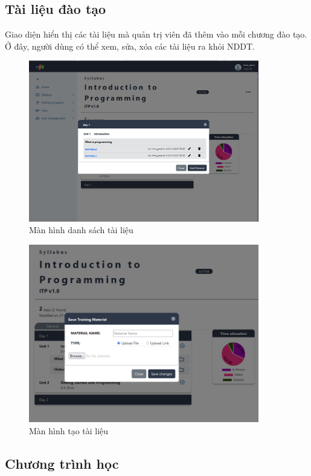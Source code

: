 \documentclass[report.tex]{subfiles}
\begin{document}
\subsection{Tài liệu đào tạo}

Giao diện hiển thị các tài liệu mà quản trị viên đã thêm vào mỗi chương đào tạo.
Ở đây, người dùng có thể xem, sửa, xóa các tài liệu ra khỏi NDDT.

\begin{figure}[!htb]
{\centering
\includegraphics[width=380px]{../meta/ui.material-list.png}
\caption{Màn hình danh sách tài liệu}
\par
}
\end{figure}
\FloatBarrier

\begin{figure}[!htb]
{\centering
\includegraphics[width=380px]{../meta/ui.material-create1.png}
\caption{Màn hình tạo tài liệu}
\par
}
\end{figure}
\FloatBarrier

\subsection{Chương trình học}
\end{document}
